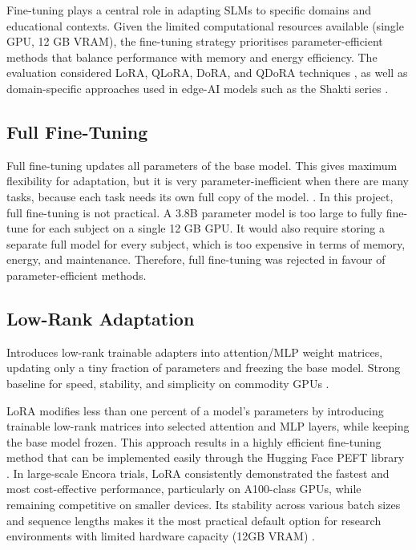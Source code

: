 Fine-tuning plays a central role in adapting SLMs to specific domains and educational contexts. Given the limited computational resources available (single GPU, 12 GB VRAM), the fine-tuning strategy prioritises parameter-efficient methods that balance performance with memory and energy efficiency. The evaluation considered LoRA, QLoRA, DoRA, and QDoRA techniques \parencite{FineTuni58:online}, as well as domain-specific approaches used in edge-AI models such as the Shakti series \parencite{FineTuni97:online}.

\subsection{Full Fine-Tuning}

Full fine-tuning updates all parameters of the base model. This gives maximum flexibility for adaptation, but it is very parameter-inefficient when there are many tasks, because each task needs its own full copy of the model. \parencite{pmlr-v97-houlsby19a}. In this project, full fine-tuning is not practical. A 3.8B parameter model is too large to fully fine-tune for each subject on a single 12 GB GPU. It would also require storing a separate full model for every subject, which is too expensive in terms of memory, energy, and maintenance. Therefore, full fine-tuning was rejected in favour of parameter-efficient methods.


\subsection{Low-Rank Adaptation}

Introduces low-rank trainable adapters into attention/MLP weight matrices, updating only a tiny fraction of parameters and freezing the base model. Strong baseline for speed, stability, and simplicity on commodity GPUs \parencite{FineTuni58:online,2106096835:online}.

LoRA modifies less than one percent of a model’s parameters by introducing trainable low-rank matrices into selected attention and MLP layers, while keeping the base model frozen. This approach results in a highly efficient fine-tuning method that can be implemented easily through the Hugging Face PEFT library \parencite{FineTuni58:online}. In large-scale Encora trials, LoRA consistently demonstrated the fastest and most cost-effective performance, particularly on A100-class GPUs, while remaining competitive on smaller devices. Its stability across various batch sizes and sequence lengths makes it the most practical default option for research environments with limited hardware capacity (12GB VRAM) \parencite{FineTuni58:online}.

